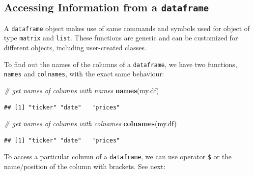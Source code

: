 \documentclass[11pt,]{book}
\newenvironment{Shaded}{\begin{snugshade}}{\end{snugshade}}
\newcommand{\KeywordTok}[1]{\textcolor[rgb]{0.27,0.27,0.27}{\textbf{#1}}}
\newcommand{\DecValTok}[1]{\textcolor[rgb]{0.06,0.06,0.06}{#1}}
\newcommand{\StringTok}[1]{\textcolor[rgb]{0.5,0.5,0.5}{#1}}
\newcommand{\CommentTok}[1]{\textcolor[rgb]{0.56,0.35,0.01}{\textit{#1}}}
\newcommand{\OperatorTok}[1]{\textcolor[rgb]{0.81,0.36,0.00}{\textbf{#1}}}
\newcommand{\NormalTok}[1]{#1}
\begin{document}
\subsection{\texorpdfstring{Accessing Information from a
\texttt{dataframe}}{Accessing Information from a dataframe}}\label{accessing-information-from-a-dataframe}

A \texttt{dataframe} object makes use of same commands and symbols used
for object of type \texttt{matrix} and \texttt{list}. These functions
are generic and can be customized for different objects, including
user-created classes.

To find out the names of the columns of a \texttt{dataframe}, we have
two functions, \texttt{names} and \texttt{colnames}, with the exact same
behaviour:  

\begin{Shaded}
\begin{Highlighting}[]
\CommentTok{# get names of columns with names}
\KeywordTok{names}\NormalTok{(my.df)}
\end{Highlighting}
\end{Shaded}

\begin{verbatim}
## [1] "ticker" "date"   "prices"
\end{verbatim}

\begin{Shaded}
\begin{Highlighting}[]
\CommentTok{# get names of columns with colnames}
\KeywordTok{colnames}\NormalTok{(my.df)}
\end{Highlighting}
\end{Shaded}

\begin{verbatim}
## [1] "ticker" "date"   "prices"
\end{verbatim}

To access a particular column of a \texttt{dataframe}, we can use
operator \texttt{\$} or the name/position of the column with brackets.
See next:

\begin{Shaded}
\end{Shaded}
\end{document}
